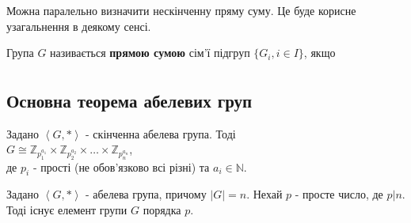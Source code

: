 \documentclass{math_library}
\begin{document}
Можна паралельно визначити нескінченну пряму суму. Це буде корисне узагальнення в деякому сенсі.

\begin{definition}
\end{definition}

\begin{definition}
Група $G$ називається \textbf{прямою сумою} сім'ї підгруп $\{G_i, i \in I\}$, якщо
\begin{align*}

\end{align*}
\end{definition}
\fi

\iffalse
\subsection{Основна теорема абелевих груп}
\begin{theorem}
Задано $\left< G, * \right>$ - скінченна абелева група. Тоді\\
$G \cong \mathbb{Z}_{p_1^{a_1}} \times \mathbb{Z}_{p_2^{a_2}} \times \dots \times \mathbb{Z}_{p_n^{a_n}}$,\\
де $p_i$ - прості (не обов'язково всі різні) та $a_i \in \mathbb{N}$.
\end{theorem}

\begin{lemma}
Задано $\left< G, * \right>$ - абелева група, причому $|G| = n$. Нехай $p$ - просте число, де $p| n $. Тоді існує елемент групи $G$ порядка $p$.
\end{lemma}
\end{document}
